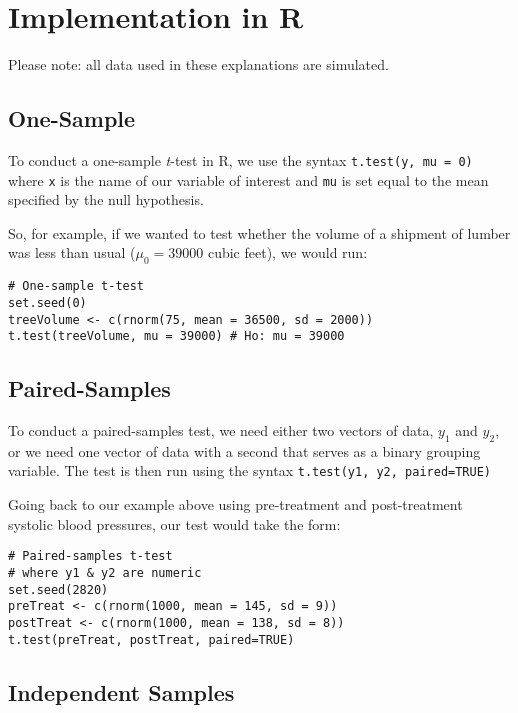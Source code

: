 \section{Implementation in R}
Please note: all data used in these explanations are simulated.

\subsection{One-Sample}
To conduct a one-sample \textit{t}-test in R, we use the syntax \verb|t.test(y, mu = 0)| where \verb|x| is the name of our variable of interest and \verb|mu| is set equal to the mean specified by the null hypothesis.

So, for example, if we wanted to test whether the volume of a shipment of lumber was less than usual ($\mu_0=39000$ cubic feet), we would run:
\begin{framed}
\begin{Verbatim}[samepage=TRUE]
# One-sample t-test
set.seed(0)
treeVolume <- c(rnorm(75, mean = 36500, sd = 2000))
t.test(treeVolume, mu = 39000) # Ho: mu = 39000
\end{Verbatim}
\end{framed}

\subsection{Paired-Samples}
To conduct a paired-samples test, we need either two vectors of data, $y_1$ and $y_2$, or we need one vector of data with a second that serves as a binary grouping variable. The test is then run using the syntax \verb|t.test(y1, y2, paired=TRUE)|

Going back to our example above using pre-treatment and post-treatment systolic blood pressures, our test would take the form:
\begin{framed}
\begin{Verbatim}[samepage=TRUE]
# Paired-samples t-test
# where y1 & y2 are numeric
set.seed(2820)
preTreat <- c(rnorm(1000, mean = 145, sd = 9))
postTreat <- c(rnorm(1000, mean = 138, sd = 8))
t.test(preTreat, postTreat, paired=TRUE)
\end{Verbatim}
\end{framed}

\subsection{Independent Samples}

